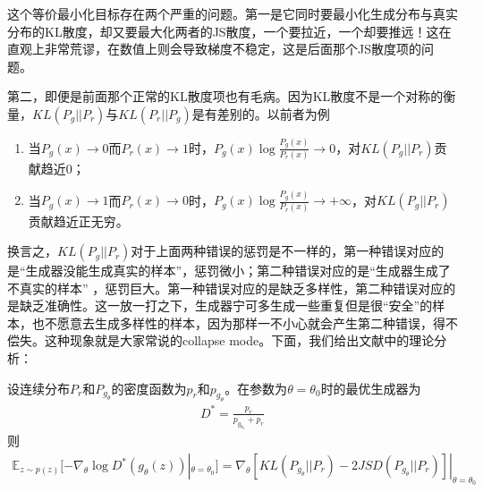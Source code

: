             \par
            这个等价最小化目标存在两个严重的问题。第一是它同时要最小化生成分布与真实分布的KL散度，却又要最大化两者的JS散度，一个要拉近，一个却要推远！这在直观上非常荒谬，在数值上则会导致梯度不稳定，这是后面那个JS散度项的问题。
            \par
            第二，即便是前面那个正常的KL散度项也有毛病。因为KL散度不是一个对称的衡量，$KL(P_g || P_r)$与$KL(P_r || P_g)$是有差别的。以前者为例
            \begin{enumerate}
                \item 当$P_g(x)\rightarrow 0$而$P_r(x)\rightarrow 1$时，$P_g(x) \log \frac{P_g(x)}{P_r(x)} \rightarrow 0$，对$KL(P_g || P_r)$贡献趋近0；
                \item 当$P_g(x)\rightarrow 1$而$P_r(x)\rightarrow 0$时，$P_g(x) \log \frac{P_g(x)}{P_r(x)} \rightarrow +\infty$，对$KL(P_g || P_r)$贡献趋近正无穷。
            \end{enumerate}
            \par
            换言之，$KL(P_g || P_r)$对于上面两种错误的惩罚是不一样的，第一种错误对应的是“生成器没能生成真实的样本”，惩罚微小；第二种错误对应的是“生成器生成了不真实的样本” ，惩罚巨大。第一种错误对应的是缺乏多样性，第二种错误对应的是缺乏准确性。这一放一打之下，生成器宁可多生成一些重复但是很“安全”的样本，也不愿意去生成多样性的样本，因为那样一不小心就会产生第二种错误，得不偿失。这种现象就是大家常说的collapse mode。下面，我们给出文献\cite{2017.Arjovsky}中的理论分析：
            \begin{theorem}[Theorem 2.5]
            设连续分布$P_r$和$P_{g_\theta}$的密度函数为$p_r$和$p_{g_\theta}$。在参数为$\theta=\theta_0$时的最优生成器为
            \begin{align*}
            D^*=\frac{p_r}{p_{g_{\theta_0}}+p_r}
            \end{align*}
            则
            \begin{align*}
            \mathbb{E}_{z\sim p(z)}[-\nabla _\theta\log D^*(g_\theta(z))|_{\theta=\theta_0}] = \nabla_\theta[KL(P_{g_\theta}||P_r) - 2JSD(P_{g_\theta}||P_r)]|_{\theta=\theta_0}
            \end{align*}
            \end{theorem}
